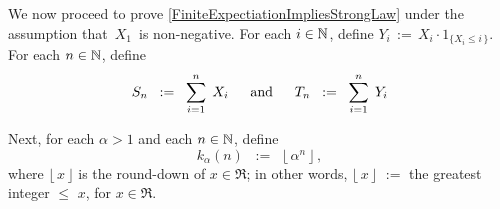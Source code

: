 \begin{enumerate}
\vskip 0.8cm
\noindent
We now proceed to prove \eqref{FiniteExpectiationImpliesStrongLaw}
under the assumption that \,$X_{1}$\, is non-negative.
For each $i \in \mathbb{N}$, define $Y_{i} \,:=\, X_{i} \cdot 1_{\{X_{i} \leq i\,\}}$.
For each $n \in \mathbb{N}$, define
\begin{equation*}
S_{n} \;\; := \;\; \overset{n}{\underset{i=1}{\sum}} \;\, X_{i}
\quad\;\;\textnormal{and}\quad\;\;
T_{n} \;\; := \;\; \overset{n}{\underset{i=1}{\sum}} \;\, Y_{i}
\end{equation*}

Next, for each $\alpha > 1$ and each $n \in \mathbb{N}$, define
\begin{equation*}
k_{\alpha}(n)
\;\; := \;\;
	\lfloor\, \alpha^{n} \,\rfloor\,,
\end{equation*}
where $\lfloor\,x\,\rfloor$ is the round-down of $x \in \Re$; in other words,
$\lfloor\,x\,\rfloor$ \;$:=$\; the greatest integer $\leq$ $x$, for $x \in \Re$.


\end{enumerate}
